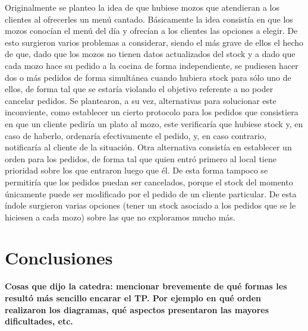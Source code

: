 \documentclass[a4paper,10pt]{article}
\begin{document}
Originalmente se planteo la idea de que hubiese mozos que atendieran a los clientes al ofrecerles un menú cantado. Básicamente la idea consistía en que los mozos conocían el menú del día y ofrecían a los clientes las opciones a elegir. De esto surgieron varios problemas a considerar, siendo el más grave de ellos el hecho de que, dado que los mozos no tienen datos actualizados del stock y a dado que cada mozo hace su pedido a la cocina de forma independiente, se pudiesen hacer dos o más pedidos de forma simultánea cuando hubiera stock para sólo uno de ellos, de forma tal que se estaría violando el objetivo referente a no poder cancelar pedidos. Se plantearon, a su vez, alternativas para solucionar este inconviente, como establecer un cierto protocolo para los pedidos que consistiera en que un cliente pediría un plato al mozo, este verificaría que hubiese stock y, en caso de haberlo, ordenaría efectivamente el pedido, y, en caso contrario, notificaría al cliente de la situación. Otra alternativa consistía en establecer un orden para los pedidos, de forma tal que quien entró primero al local tiene prioridad sobre los que entraron luego que él. De esta forma tampoco se permitiría que los pedidos puedan ser cancelados, porque el stock del momento únicamente puede ser modificado por el pedido de un cliente particular. De esta índole surgieron varias opciones (tener un stock asociado a los pedidos que se le hiciesen a cada mozo) sobre las que no exploramos mucho más.

\newpage
\section*{Conclusiones}

\textbf{Cosas que dijo la catedra: mencionar brevemente de qué formas les resultó más sencillo encarar el TP. Por ejemplo en qué orden realizaron los diagramas, qué aspectos presentaron las mayores dificultades, etc.}
\end{document}
